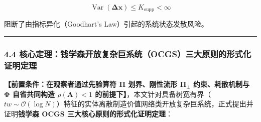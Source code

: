 \documentclass[
]{article}
\begin{document}
\[\operatorname{Var}(\mathbf{\Delta}\mathbf{x}) \le K_{\mathrm{supp}} < \infty\]

阻断了由指标异化（Goodhart's Law）引起的系统状态发散风险。

\begin{center}\rule{0.5\linewidth}{0.5pt}\end{center}

\subsubsection{4.4
核心定理：钱学森开放复杂巨系统（OCGS）三大原则的形式化证明定理}\label{ux6838ux5fc3ux5b9aux7406ux94b1ux5b66ux68eeux5f00ux653eux590dux6742ux5de8ux7cfbux7edfocgsux4e09ux5927ux539fux5219ux7684ux5f62ux5f0fux5316ux8bc1ux660eux5b9aux7406}

\textbf{【前置条件：在观察者通过先验算符 \(\mathbf{\Pi}\) 划界、刚性流形
\(\mathbf{\Pi}_\bot\) 约束、耗散机制与 \(\mathbf{\Phi}\) 自省共同构造
\(\rho(\mathbf{A}) < 1\)
的前提下】}，本文针对具备树宽有界（\(tw \sim \mathcal{O}(\log N)\)）特征的实体离散制造价值网络类开放复杂巨系统，正式提出并证明\textbf{钱学森
OCGS 三大核心原则的形式化证明定理}：
\end{document}
